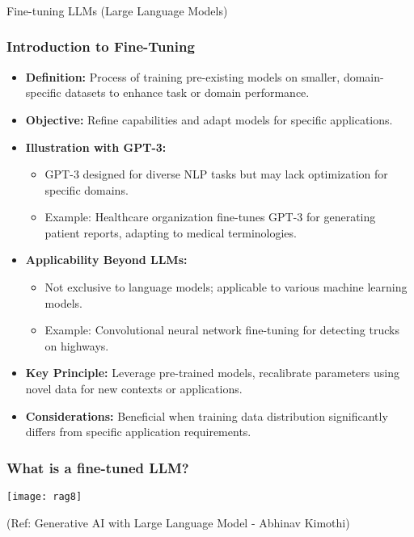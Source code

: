 \begin{frame}[fragile]\frametitle{}
\begin{center}
{\Large Fine-tuning LLMs (Large Language Models)}
\end{center}
\end{frame}

\begin{frame}[fragile]\frametitle{Introduction to Fine-Tuning}
  \begin{itemize}
    \item \textbf{Definition:} Process of training pre-existing models on smaller, domain-specific datasets to enhance task or domain performance.
    \item \textbf{Objective:} Refine capabilities and adapt models for specific applications.
    \item \textbf{Illustration with GPT-3:}
      \begin{itemize}
        \item GPT-3 designed for diverse NLP tasks but may lack optimization for specific domains.
        \item Example: Healthcare organization fine-tunes GPT-3 for generating patient reports, adapting to medical terminologies.
      \end{itemize}
    \item \textbf{Applicability Beyond LLMs:}
      \begin{itemize}
        \item Not exclusive to language models; applicable to various machine learning models.
        \item Example: Convolutional neural network fine-tuning for detecting trucks on highways.
      \end{itemize}
    \item \textbf{Key Principle:} Leverage pre-trained models, recalibrate parameters using novel data for new contexts or applications.
    \item \textbf{Considerations:} Beneficial when training data distribution significantly differs from specific application requirements.
  \end{itemize}
\end{frame}


\begin{frame}[fragile]\frametitle{What is a fine-tuned LLM?}


		\begin{center}
		\texttt{[image: rag8]}
		\end{center}

{\tiny (Ref: Generative AI with Large Language Model - Abhinav  Kimothi)}

\end{frame}



